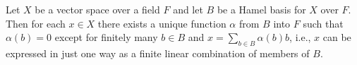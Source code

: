 Let $X$ be a vector space over a field $F$ and let $B$ be a Hamel basis for $X$ over $F$. Then for each $x \in X$ there exists a unique function $\alpha$ from $B$ into $F$ such that $\alpha(b) = 0$ except for finitely many $b \in B$ and $x = \sum_{b \in B} \alpha(b) b$, i.e., $x$ can be expressed in just one way as a finite linear combination of members of $B$.